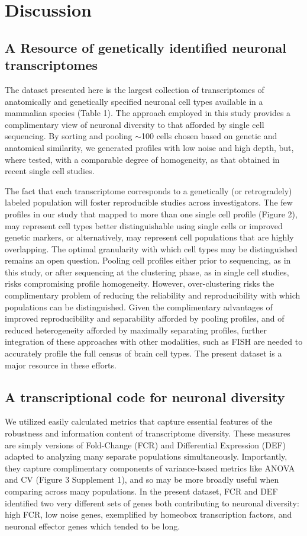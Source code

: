 
\section{Discussion}

\subsection{A Resource of genetically identified neuronal transcriptomes}

The dataset presented here is the largest collection of transcriptomes of anatomically and genetically specified neuronal cell types available in a mammalian species (Table 1). The approach employed in this study provides a complimentary view of neuronal diversity to that afforded by single cell sequencing. By sorting and pooling $\sim$100 cells chosen based on genetic and anatomical similarity, we generated profiles with low noise and high depth, but, where tested, with a comparable degree of homogeneity, as that obtained in recent single cell studies. 

The fact that each transcriptome corresponds to a genetically (or retrogradely) labeled population will foster reproducible studies across investigators. The few profiles in our study that mapped to more than one single cell profile (Figure 2), may represent cell types better distinguishable using single cells or improved genetic markers, or alternatively, may represent cell populations that are highly overlapping. The optimal granularity with which cell types may be distinguished remains an open question.  Pooling cell profiles either prior to sequencing, as in this study, or after sequencing at the clustering phase, as in single cell studies, risks compromising profile homogeneity. However, over-clustering risks the complimentary problem of reducing the reliability and reproducibility with which populations can be distinguished. Given the complimentary advantages of improved reproducibility and separability afforded by pooling profiles, and of reduced heterogeneity afforded by maximally separating profiles, further integration of these approaches with other modalities, such as FISH \citep{Moffitt_2016} are needed to accurately profile the full census of brain cell types. The present dataset is a major resource in these efforts. 

\subsection{A transcriptional code for neuronal diversity}
We utilized easily calculated metrics that capture essential features of the robustness and information content of transcriptome diversity. These measures are simply versions of Fold-Change (FCR) and Differential Expression (DEF) adapted to analyzing many separate populations simultaneously. Importantly, they capture complimentary components of variance-based metrics like ANOVA and CV (Figure 3 Supplement 1), and so may be more broadly useful when comparing across many populations. In the present dataset, FCR and DEF identified two very different sets of genes both contributing to neuronal diversity: high FCR, low noise genes, exemplified by homeobox transcription factors, and neuronal effector genes which tended to be long. 

